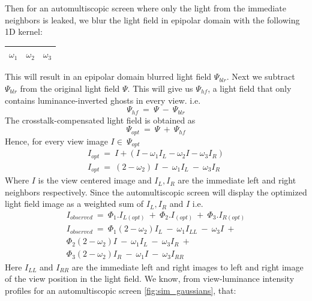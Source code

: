 \noindent 
Then for an automultiscopic screen where only the light from the immediate neighbors is leaked, we blur the light field in epipolar domain with the following 1D kernel:
\begin{table}[H]
\centering
\begin{tabular}{|c|c|c|}
\hline
$\omega_1$ & $\omega_2$ & $\omega_3$ \\
\hline
\end{tabular}
\label{tab:blurring_kernel}
\end{table}
\noindent
This will result in an epipolar domain blurred light field $\Psi_{blr}$. Next we subtract $\Psi_{blr}$ from the original light field $\Psi$. This will give us  $\Psi_{hf}$, a light field that only contains luminance-inverted ghosts in every view. i.e.
\begin{equation}
\Psi_{hf}\: =\: \Psi\: -\: \Psi_{blr}
\end{equation}
The crosstalk-compensated light field is obtained as
\begin{equation}
\Psi_{opt}\: =\: \Psi\: +\: \Psi_{hf}
\end{equation}
Hence, for every view image $I \in\: \Psi_{opt}$
\begin{equation}
\begin{aligned}
I_{opt}\: =\:  I + (I - \omega_1I_L - \omega_2I - \omega_3I_R) \\
I_{opt}\: = \: (2-\omega_2)\ I\: -\: \omega_1I_L\: -\: \omega_3I_R
\end{aligned}
\end{equation}
Where $I$ is the view centered image and $I_L, I_R$ are the immediate left and right neighbors respectively. Since the automultiscopic screen will display the optimized light field image as a weighted sum of $I_L, I_R$ and $I$ i.e.
\begin{equation}
\begin{aligned}
I_{observed}\: =\:  \Phi_1.I_{L(opt)}\: + \:\Phi_2.I_{(opt)}\: + \:\Phi_3.I_{R(opt)}       \\
I_{observed}\: = \: \Phi_1{(2-\omega_2) I_L\: -\: \omega_1I_{LL}\: -\: \omega_3I}\:+  \\
                    \Phi_2{(2-\omega_2) I\: -\: \omega_1I_{L}\: -\: \omega_3I_R}\:+   \\
                    \Phi_3{(2-\omega_2) I_R\: -\: \omega_1I\: -\: \omega_3I_{RR}}
\end{aligned}
\end{equation}
Here $I_{LL}$ and $I_{RR}$ are the immediate left and right images to left and right image of the view position in the light field. We know, from view-luminance intensity profiles for an automultiscopic screen \ref{fig:sim_gaussians}, that:
